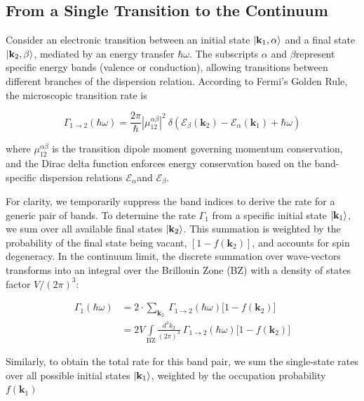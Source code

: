 \subsection{From a Single Transition to the Continuum}
Consider an electronic transition between an initial state $\ket{\mathbf{k}_{1}, \alpha}$ and a final state $\ket{\mathbf{k}_{2}, \beta}$, mediated by an energy transfer $\hbar \omega$. The subscripts $\alpha$ and $\beta$represent specific energy bands (valence or conduction), allowing transitions between different branches of the dispersion relation. According to Fermi's Golden Rule, the microscopic transition rate is

\begin{equation}
\Gamma_{1\to 2}(\hbar\omega) = \frac{2\pi}{\hbar} \left|\mu_{12}^{\alpha\beta}\right|^{2} \ \delta\left(\mathcal{E}_{\beta}(\mathbf{k}_{2}) - \mathcal{E}_{\alpha}(\mathbf{k}_{1}) + \hbar\omega \right)
\label{eq:single_transition_rate}
\end{equation}

where $\mu_{12}^{\alpha\beta}$ is the transition dipole moment governing momentum conservation, and the Dirac delta function enforces energy conservation based on the band-specific dispersion relations $\mathcal{E}_{\alpha}$and $\mathcal{E}_{\beta}$.

For clarity, we temporarily suppress the band indices to derive the rate for a generic pair of bands. To determine the rate $\Gamma_{1}$ from a specific initial state $\ket{\mathbf{k}_{1}}$, we sum over all available final states $\ket{\mathbf{k}_{2}}$. This summation is weighted by the probability of the final state being vacant, $[1-f(\mathbf{k}_{2})]$, and accounts for spin degeneracy. In the continuum limit, the discrete summation over wave-vectors transforms into an integral over the Brillouin Zone (BZ) with a density of states factor $V/(2\pi)^{3}$:

\begin{align}
\Gamma_{1}(\hbar\omega) &= 2 \cdot \sum_{\mathbf{k}_{2}} \ \Gamma_{1\to 2}(\hbar\omega) \Big[1-f(\mathbf{k}_{2})\Big] \\
&= 2V \int\limits_{\text{BZ}} \frac{d^{3}k_{2}}{(2\pi)^{3}} \ \Gamma_{1\to 2}(\hbar\omega) \Big[1-f(\mathbf{k}_{2})\Big] 
\label{eq:continuum_single_rate}
\end{align}

Similarly, to obtain the total rate for this band pair, we sum the single-state rates over all possible initial states $\ket{\mathbf{k}_{1}}$, weighted by the occupation probability $f(\mathbf{k}_{1})$

